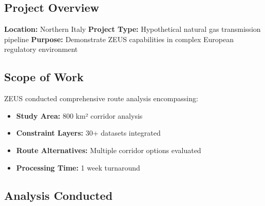 \documentclass[11pt,letterpaper]{article}
\begin{document}
\subsection{Project Overview}

\textbf{Location:} Northern Italy  
\textbf{Project Type:} Hypothetical natural gas transmission pipeline  
\textbf{Purpose:} Demonstrate ZEUS capabilities in complex European regulatory environment

\subsection{Scope of Work}

ZEUS conducted comprehensive route analysis encompassing:

\begin{itemize}[leftmargin=*]
    \item \textbf{Study Area:} 800 km² corridor analysis
    \item \textbf{Constraint Layers:} 30+ datasets integrated
    \item \textbf{Route Alternatives:} Multiple corridor options evaluated
    \item \textbf{Processing Time:} 1 week turnaround
\end{itemize}

\subsection{Analysis Conducted}
\end{document}
